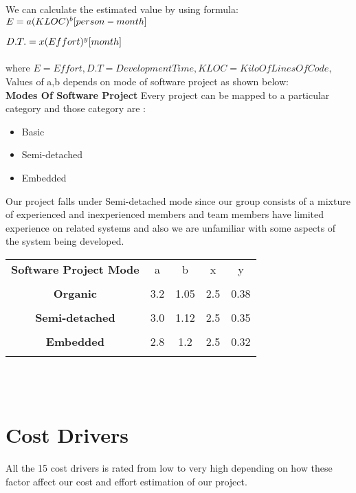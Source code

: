 \documentclass[12pt]{article}
\begin{document}
We can calculate the estimated value by using formula:\\ 
$
\\E=a(KLOC)^b  [person-month]
$

$\\D.T. = x(Effort)^y   [month]$ \\ \\
where $ E = Effort,  D.T = Development Time, KLOC=  Kilo Of Lines Of Code,$\\
 Values of a,b depends on mode of software project as shown below:\\
 
 \textbf{Modes Of Software Project}
 Every project can be mapped to a particular category and those category are :\\
 \begin{itemize}
    

 \item Basic
 \item Semi-detached
 \item Embedded
  \end{itemize}
 
  Our project falls under Semi-detached mode since our group consists of a mixture of experienced and inexperienced members and team members have limited experience on related systems and also we are unfamiliar with some aspects of the system being developed. \\
  
 \begin{tabular}{c c c c c}
  \textbf{Software Project Mode} & a &b & x & y \\ \\
 
 \textbf{Organic} & 3.2 & 1.05 & 2.5 & 0.38  \\ \\
 \textbf{Semi-detached} & 3.0 & 1.12 & 2.5 & 0.35\\ \\
 \textbf{Embedded} & 2.8 & 1.2  & 2.5 & 0.32\\ \\
 
 \end{tabular}\\ \\
 
 \section{Cost Drivers}
 All the 15 cost drivers is rated from low to very high depending on how these factor affect our cost and effort estimation of our project.
 
\end{document}
